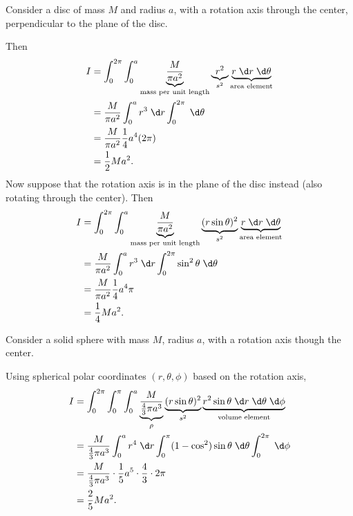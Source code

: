 \documentclass[a4paper]{article}
\begin{document}
\begin{eg}
  Consider a disc of mass $M$ and radius $a$, with a rotation axis through the center, perpendicular to the plane of the disc.
  \begin{center}
  \end{center}
  Then
  \begin{align*}
    I &= \int_{0}^{2\pi}\int_0^a \underbrace{\frac{M}{\pi a^2}}_{\text{mass per unit length}} \underbrace{r^2}_{s^2} \underbrace{r\;\d r\;\d \theta}_{\text{area element}}\\
    &= \frac{M}{\pi a^2}\int_0^a r^3\;\d r \int_0^{2\pi}\;\d \theta\\
    &= \frac{M}{\pi a^2}\frac{1}{4}a^4 (2\pi)\\
    &= \frac{1}{2}Ma^2.
  \end{align*}
  Now suppose that the rotation axis is in the plane of the disc instead (also rotating through the center). Then
  \begin{align*}
    I &= \int_{0}^{2\pi}\int_0^a \underbrace{\frac{M}{\pi a^2}}_{\text{mass per unit length}} \underbrace{(r\sin \theta)^2}_{s^2} \underbrace{r\;\d r\;\d \theta}_{\text{area element}}\\
    &= \frac{M}{\pi a^2}\int_0^a r^3\;\d r \int_0^{2\pi}\sin^2 \theta\;\d \theta\\
    &= \frac{M}{\pi a^2}\frac{1}{4}a^4 \pi\\
    &= \frac{1}{4}Ma^2.
  \end{align*}
\end{eg}
\begin{eg}
  Consider a solid sphere with mass $M$, radius $a$, with a rotation axis though the center.
  \begin{center}
  \end{center}
  Using spherical polar coordinates $(r, \theta, \phi)$ based on the rotation axis,
  \begin{align*}
    I &= \int_{0}^{2\pi}\int_0^\pi\int_0^a \underbrace{\frac{M}{\frac{4}{3}\pi a^3}}_{\rho}\underbrace{(r\sin \theta)^2}_{s^2} \underbrace{r^2\sin \theta\;\d r\;\d \theta\;\d \phi}_{\text{volume element}}\\
    &= \frac{M}{\frac{4}{3}\pi a^3}\int_0^a r^4 \;\d r\int_0^\pi (1 - \cos^2)\sin \theta\;\d \theta \int_0^{2\pi}\;\d \phi\\
    &= \frac{M}{\frac{4}{3}\pi a^3}\cdot \frac{1}{5}a^5 \cdot \frac{4}{3}\cdot 2\pi\\
    &= \frac{2}{5}Ma^2.
  \end{align*}
\end{eg}
\end{document}
